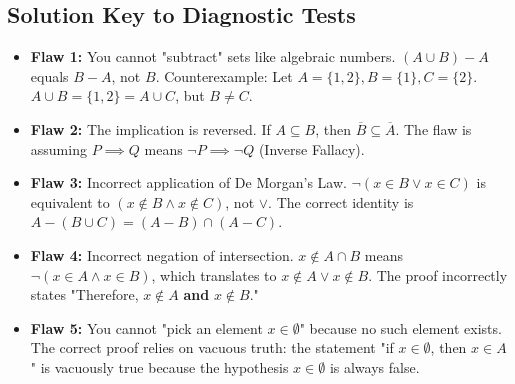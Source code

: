 \documentclass[11pt, a4paper]{article}
\theoremstyle{definition}
\theoremstyle{remark}
\begin{document}
\subsection{Solution Key to Diagnostic Tests}
\begin{itemize}
    \item \textbf{Flaw 1:} You cannot "subtract" sets like algebraic numbers. $(A \cup B) - A$ equals $B - A$, not $B$. Counterexample: Let $A = \{1, 2\}, B = \{1\}, C = \{2\}$. $A \cup B = \{1, 2\} = A \cup C$, but $B \neq C$.
    \item \textbf{Flaw 2:} The implication is reversed. If $A \subseteq B$, then $\overline{B} \subseteq \overline{A}$. The flaw is assuming $P \implies Q$ means $\neg P \implies \neg Q$ (Inverse Fallacy).
    \item \textbf{Flaw 3:} Incorrect application of De Morgan's Law. $\neg(x \in B \lor x \in C)$ is equivalent to $(x \notin B \land x \notin C)$, not $\lor$. The correct identity is $A - (B \cup C) = (A - B) \cap (A - C)$.
    \item \textbf{Flaw 4:} Incorrect negation of intersection. $x \notin A \cap B$ means $\neg(x \in A \land x \in B)$, which translates to $x \notin A \lor x \notin B$. The proof incorrectly states "Therefore, $x \notin A$ \textbf{and} $x \notin B$."
    \item \textbf{Flaw 5:} You cannot "pick an element $x \in \emptyset$" because no such element exists. The correct proof relies on vacuous truth: the statement "if $x \in \emptyset$, then $x \in A$" is vacuously true because the hypothesis $x \in \emptyset$ is always false.
\end{itemize}
\end{document}
